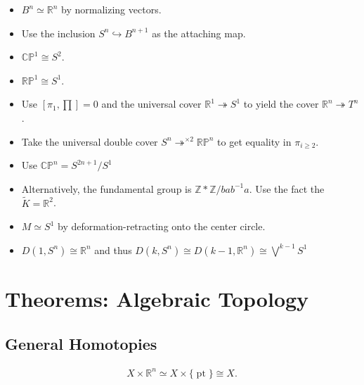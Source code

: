 \begin{fact}
\begin{itemize}
\item
  \(B^n \simeq{\mathbb{R}}^n\) by normalizing vectors.
\item
  Use the inclusion \(S^n \hookrightarrow B^{n+1}\) as the attaching
  map.
\item
  \({\mathbb{CP}}^1 \cong S^2\).
\item
  \({\mathbb{RP}}^1 \cong S^1\).
\item
  Use \(\left[ \pi_{1}, \prod \right]= 0\) and the universal cover
  \({\mathbb{R}}^1 \twoheadrightarrow S^1\) to yield the cover
  \({\mathbb{R}}^n \twoheadrightarrow T^n\).
\item
  Take the universal double cover
  \(S^n \twoheadrightarrow^{\times 2} {\mathbb{RP}}^n\) to get equality
  in \(\pi_{i\geq 2}\).
\item
  Use \({\mathbb{CP}}^n = S^{2n+1} / S^1\)
\item
  Alternatively, the fundamental group is
  \({\mathbb{Z}}\ast{\mathbb{Z}}/ bab^{-1}a\). Use the fact the
  \(\tilde K = {\mathbb{R}}^2\).
\item
  \(M \simeq S^1\) by deformation-retracting onto the center circle.
\item
  \(D(1, S^n) \cong {\mathbb{R}}^n\) and thus
  \(D(k, S^n) \cong D(k-1, {\mathbb{R}}^n) \cong \bigvee^{k-1} S^1\)
\end{itemize}

\end{fact}

\hypertarget{theorems-algebraic-topology}{%
\section{Theorems: Algebraic
Topology}\label{theorems-algebraic-topology}}

\hypertarget{general-homotopies}{%
\subsection{General Homotopies}\label{general-homotopies}}

\begin{fact}

\begin{align*}
X\times{\mathbb{R}}^n \simeq X \times{\{\operatorname{pt}\}}\cong X
.\end{align*}

\end{fact}

